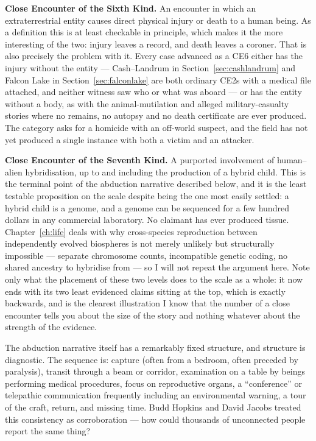 \textbf{Close Encounter of the Sixth Kind.} An encounter in which an extraterrestrial entity
causes direct physical injury or death to a human being. As a definition this is at least
checkable in principle, which makes it the more interesting of the two: injury leaves a
record, and death leaves a coroner. That is also precisely the problem with it. Every case
advanced as a CE6 either has the injury without the entity --- Cash--Landrum in
Section~\ref{sec:cashlandrum} and Falcon Lake in Section~\ref{sec:falconlake} are both
ordinary CE2s with a medical file attached, and neither witness saw who or what was aboard ---
or has the entity without a body, as with the animal-mutilation and alleged
military-casualty stories where no remains, no autopsy and no death certificate are ever
produced. The category asks for a homicide with an off-world suspect, and the field has not
yet produced a single instance with both a victim and an attacker.

\textbf{Close Encounter of the Seventh Kind.} A purported involvement of human--alien
hybridisation, up to and including the production of a hybrid child. This is the terminal point
of the abduction narrative described below, and it is the least testable proposition on the
scale despite being the one most easily settled: a hybrid child is a genome, and a genome can be
sequenced for a few hundred dollars in any commercial laboratory. No claimant has ever produced
tissue.  Chapter~\ref{ch:life} deals with
why cross-species reproduction between independently evolved biospheres is not merely unlikely
but structurally impossible --- separate chromosome counts, incompatible genetic coding, no
shared ancestry to hybridise from --- so I will not repeat the argument here. Note only what the
placement of these two levels does to the scale as a whole: it now ends with its two least
evidenced claims sitting at the top, which is exactly backwards, and is the clearest
illustration I know that the number of a close encounter tells you about the size of the story
and nothing whatever about the strength of the evidence.

\Needspace*{3.4in}


The abduction narrative itself has a remarkably fixed structure, and structure is diagnostic.
The sequence is: capture (often from a bedroom, often preceded by paralysis), transit through
a beam or corridor, examination on a table by beings performing medical procedures, focus on
reproductive organs, a ``conference'' or telepathic communication frequently including an
environmental warning, a tour of the craft, return, and missing time. Budd Hopkins and David
Jacobs treated this consistency as corroboration --- how could thousands of unconnected people
report the same thing?

